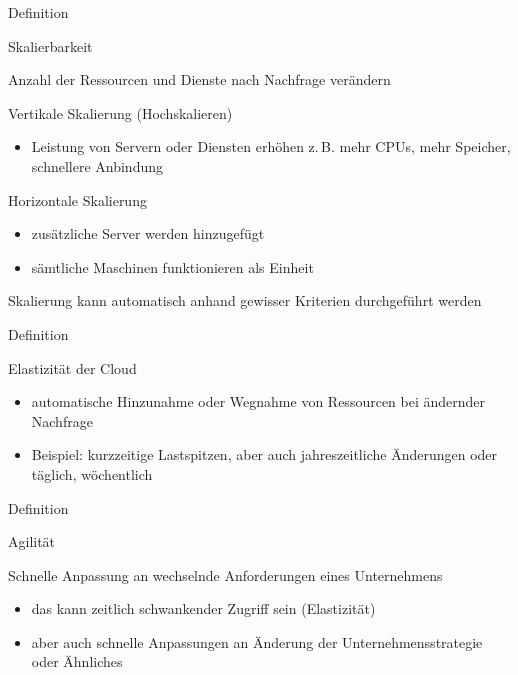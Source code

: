 \documentclass{scrartcl}
\newenvironment{flashcard}[2][]{%
    #1
    \vfill
    \centerline{\Large{#2}}
    \vfill
\newpage
}
{\newpage}
\begin{document}
    \begin{flashcard}[Definition]{Skalierbarkeit}
        Anzahl der Ressourcen und Dienste nach Nachfrage verändern

        \vspace{5mm}
        Vertikale Skalierung (Hochskalieren)
        \begin{itemize}
            \item Leistung von Servern oder Diensten erhöhen\newline
            z.\,B. mehr CPUs, mehr Speicher, schnellere Anbindung
        \end{itemize}

        Horizontale Skalierung
        \begin{itemize}
            \item zusätzliche Server werden hinzugefügt
            \item sämtliche Maschinen funktionieren als Einheit
        \end{itemize}

        \vspace{5mm}
        Skalierung kann automatisch anhand gewisser Kriterien durchgeführt werden
    \end{flashcard}

    \begin{flashcard}[Definition]{Elastizität der Cloud}
        \begin{itemize}
            \item automatische Hinzunahme oder Wegnahme von Ressourcen bei ändernder Nachfrage
            \item Beispiel: kurzzeitige Lastspitzen, aber auch jahreszeitliche Änderungen oder täglich, wöchentlich
        \end{itemize}

    \end{flashcard}

    \begin{flashcard}[Definition]{Agilität}

        \vspace{5mm}
        Schnelle Anpassung an wechselnde Anforderungen eines Unternehmens
        \begin{itemize}
            \item das kann zeitlich schwankender Zugriff sein (Elastizität)
            \item aber auch schnelle Anpassungen an Änderung der Unternehmensstrategie oder Ähnliches
        \end{itemize}

    \end{flashcard}
\end{document}
